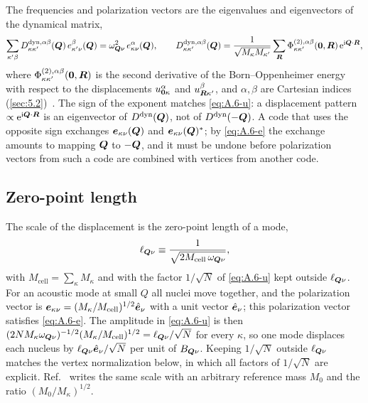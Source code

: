 The frequencies and polarization vectors are the eigenvalues and eigenvectors of the dynamical matrix,
\begin{equation}
  \sum_{\kappa'\beta}D^{\mathrm{dyn},\alpha\beta}_{\kappa\kappa'}(\bm{Q})\,e^{\beta}_{\kappa'\nu}(\bm{Q}) = \omega_{\bm{Q}\nu}^2\,e^{\alpha}_{\kappa\nu}(\bm{Q}), \qquad
  D^{\mathrm{dyn},\alpha\beta}_{\kappa\kappa'}(\bm{Q}) = \frac{1}{\sqrt{M_\kappa M_{\kappa'}}}\sum_{\bm{R}}\Phi^{(2),\alpha\beta}_{\kappa\kappa'}(\bm{0},\bm{R})\,\mathrm{e}^{\mathrm{i}\bm{Q}\cdot\bm{R}},
  \label{eq:A.6-Ddyn}
\end{equation}
where $\Phi^{(2),\alpha\beta}_{\kappa\kappa'}(\bm{0},\bm{R})$ is the second derivative of the Born--Oppenheimer energy with respect to the displacements $u^\alpha_{\bm{0}\kappa}$ and $u^\beta_{\bm{R}\kappa'}$, and $\alpha,\beta$ are Cartesian indices (\cref{sec:5.2})~\cite[Eq.~(14)]{giustino2017electron}. The sign of the exponent matches \cref{eq:A.6-u}: a displacement pattern $\propto\mathrm{e}^{\mathrm{i}\bm{Q}\cdot\bm{R}}$ is an eigenvector of $D^{\mathrm{dyn}}(\bm{Q})$, not of $D^{\mathrm{dyn}}(-\bm{Q})$. A code that uses the opposite sign exchanges $\bm{e}_{\kappa\nu}(\bm{Q})$ and $\bm{e}_{\kappa\nu}(\bm{Q})^*$; by \cref{eq:A.6-e} the exchange amounts to mapping $\bm{Q}$ to $-\bm{Q}$, and it must be undone before polarization vectors from such a code are combined with vertices from another code.

\subsection{Zero-point length}

The scale of the displacement is the zero-point length of a mode,
\begin{equation}
  \ell_{\bm{Q}\nu} \equiv \frac{1}{\sqrt{2M_{\mathrm{cell}}\,\omega_{\bm{Q}\nu}}},
  \label{eq:A.6-ell}
\end{equation}
with $M_{\mathrm{cell}} = \sum_\kappa M_\kappa$ and with the factor $1/\sqrt N$ of \cref{eq:A.6-u} kept outside $\ell_{\bm{Q}\nu}$. For an acoustic mode at small $Q$ all nuclei move together, and the polarization vector is $\bm{e}_{\kappa\nu} = (M_\kappa/M_{\mathrm{cell}})^{1/2}\hat{\bm{e}}_\nu$ with a unit vector $\hat{\bm{e}}_\nu$; this polarization vector satisfies \cref{eq:A.6-e}. The amplitude in \cref{eq:A.6-u} is then $(2NM_\kappa\omega_{\bm{Q}\nu})^{-1/2}(M_\kappa/M_{\mathrm{cell}})^{1/2} = \ell_{\bm{Q}\nu}/\sqrt N$ for every $\kappa$, so one mode displaces each nucleus by $\ell_{\bm{Q}\nu}\hat{\bm{e}}_\nu/\sqrt N$ per unit of $B_{\bm{Q}\nu}$. Keeping $1/\sqrt N$ outside $\ell_{\bm{Q}\nu}$ matches the vertex normalization below, in which all factors of $1/\sqrt N$ are explicit. Ref.~\cite[Eq.~(34)]{giustino2017electron} writes the same scale with an arbitrary reference mass $M_0$ and the ratio $(M_0/M_\kappa)^{1/2}$.

